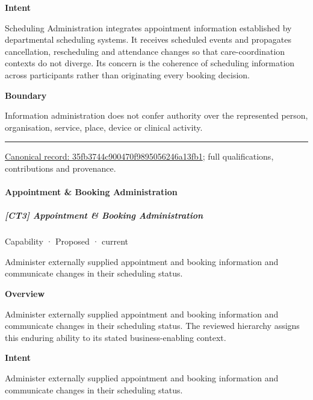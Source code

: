 \textbf{Intent}



Scheduling Administration integrates appointment information established by departmental scheduling systems. It receives scheduled events and propagates cancellation, rescheduling and attendance changes so that care-coordination contexts do not diverge. Its concern is the coherence of scheduling information across participants rather than originating every booking decision.



\textbf{Boundary}



Information administration does not confer authority over the represented person, organisation, service, place, device or clinical activity.



\medskip\hrule\medskip

{\footnotesize \href{../../../../continuum/strategy/capability/35fb3744c900470f9895056246a13fb1.md}{Canonical record: 35fb3744c900470f9895056246a13fb1}; full qualifications, contributions and provenance.}\par
\paragraph{Appointment \& Booking Administration}

\subparagraph{[CT3] Appointment \& Booking Administration}

\label{element:7b3ba9bcac564dd4a7a08631581db2ca}
{\small Capability · Proposed · current}\par

Administer externally supplied appointment and booking information and communicate changes in their scheduling status.



\textbf{Overview}



Administer externally supplied appointment and booking information and communicate changes in their scheduling status. The reviewed hierarchy assigns this enduring ability to its stated business-enabling context.



\textbf{Intent}



Administer externally supplied appointment and booking information and communicate changes in their scheduling status.



